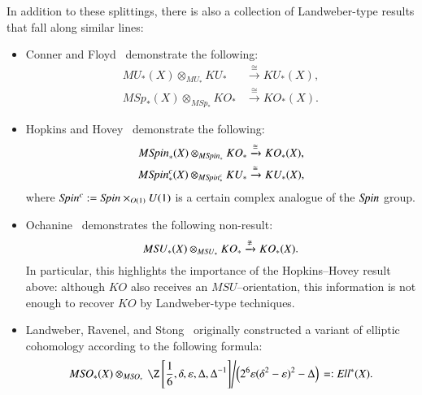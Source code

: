 In addition to these splittings, there is also a collection of Landweber-type results that fall along similar lines:
\begin{itemize}
    \item Conner and Floyd~\cite{ConnerFloyd} demonstrate the following:
    \begin{align*}
    MU_*(X) \otimes_{MU_*} KU_* & \xrightarrow\cong KU_*(X), \\
    M\mathit{Sp}_*(X) \otimes_{M\mathit{Sp}_*} KO_* & \xrightarrow\cong KO_*(X).
    \end{align*}
    \item Hopkins and Hovey~\cite[Theorem 1]{HopkinsHovey} demonstrate the following:
    \begin{align*}
    M\mathit{Spin}_*(X) \otimes_{M\mathit{Spin}_*} KO_* & \xrightarrow\cong KO_*(X), \\
    M\mathit{Spin}^c_*(X) \otimes_{M\mathit{Spin}^c_*} KU_* & \xrightarrow\cong KU_*(X),
    \end{align*}
    where $\mathit{Spin}^c := \mathit{Spin} \times_{O(1)} U(1)$ is a certain complex analogue of the $\mathit{Spin}$ group.
    \item Ochanine~\cite{OchanineSUModules} demonstrates the following non-result: \[M\mathit{SU}_*(X) \otimes_{M\mathit{SU}_*} KO_* \xrightarrow{\not\cong} KO_*(X).\]  In particular, this highlights the importance of the Hopkins--Hovey result above: although $KO$ also receives an $MSU$--orientation, this information is not enough to recover $KO$ by Landweber-type techniques.
    \item Landweber, Ravenel, and Stong~\cite{LandweberEll,LRS} originally constructed a variant of elliptic cohomology according to the following formula:  \[M\SO_*(X) \otimes_{M\SO_*} \left.\Z\left[\frac{1}{6}, \delta, \eps, \Delta, \Delta^{-1}\right] \middle/ \left(2^6 \eps (\delta^2 - \eps)^2 - \Delta\right)\right. =: \mathit{Ell}^*(X).\]
\end{itemize}

